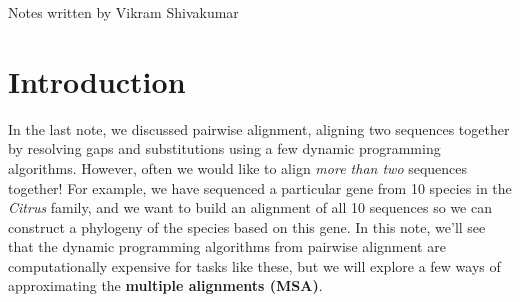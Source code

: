 \documentclass[12pt]{article}
\begin{document}
\thispagestyle{plain}
   \newpage
   \setcounter{page}{1}
   \noindent
   \begin{center}
   \end{center}
   {Notes written by Vikram Shivakumar}
   \vspace*{4mm}


\section{Introduction}
In the last note, we discussed pairwise alignment, aligning two sequences together by resolving gaps and substitutions using a few dynamic programming algorithms. However, often we would like to align \textit{more than two} sequences together! For example, we have sequenced a particular gene from 10 species in the \textit{Citrus} family, and we want to build an alignment of all 10 sequences so we can construct a phylogeny of the species based on this gene. In this note, we'll see that the dynamic programming algorithms from pairwise alignment are computationally expensive for tasks like these, but we will explore a few ways of approximating the \textbf{multiple alignments (MSA)}.
\end{document}
